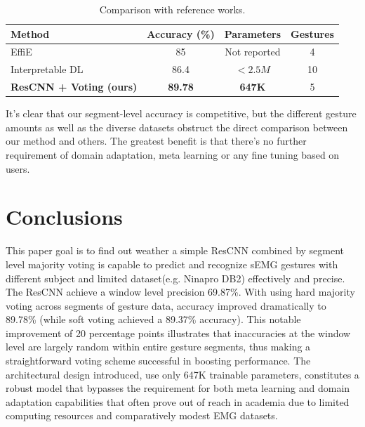\documentclass[article,submit,pdftex,moreauthors]{Definitions/mdpi}
\begin{document}
\begin{table}[H]
\caption{Comparison with reference works.\label{tab:comparison}}
\begin{tabularx}{\textwidth}{lccc}
\toprule
\textbf{Method} & \textbf{Accuracy (\%)} & \textbf{Parameters} & \textbf{Gestures} \\
\midrule
EffiE \citep{Lu2023effie} & 85 & Not reported & 4 \\
Interpretable DL \citep{Tina2025real} & 86.4 & $< 2.5M$ & 10 \\
\textbf{ResCNN + Voting (ours)} & \textbf{89.78} & \textbf{647K} & 5 \\
\bottomrule
\end{tabularx}
\end{table}

It's clear that our segment-level accuracy is competitive, but the different gesture amounts as well as the diverse datasets obstruct the direct comparison between our method and others. The greatest benefit is that there's no further requirement of domain adaptation, meta learning or any fine tuning based on users.


\section{Conclusions}

This paper goal is to find out weather a simple ResCNN combined by segment level majority voting is capable to predict and recognize sEMG gestures with different subject and limited dataset(e.g. Ninapro DB2) effectively and precise. The ResCNN achieve a window level precision 69.87\%. With using hard majority voting across segments of gesture data, accuracy improved dramatically to 89.78\% (while soft voting achieved a 89.37\% accuracy). This notable improvement of 20 percentage points illustrates that inaccuracies at the window level are largely random within entire gesture segments, thus making a straightforward voting scheme successful in boosting performance. The architectural design introduced, use only 647K trainable parameters, constitutes a robust model that bypasses the requirement for both meta learning and domain adaptation capabilities that often prove out of reach in academia due to limited computing resources and comparatively modest EMG datasets.



\vspace{6pt}





\end{document}
